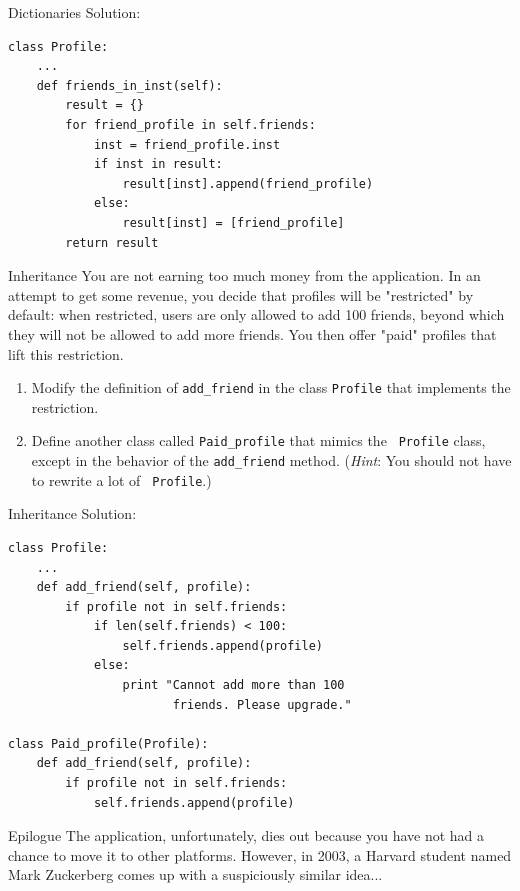 \documentclass[9pt]{beamer}
\begin{document}
\begin{frame}[fragile]{Dictionaries}
  Solution:

  \begin{lstlisting}
class Profile:
    ...
    def friends_in_inst(self):
        result = {}
        for friend_profile in self.friends:
            inst = friend_profile.inst
            if inst in result:
                result[inst].append(friend_profile)
            else:
                result[inst] = [friend_profile]
        return result
  \end{lstlisting}
\end{frame}

\begin{frame}[fragile]{Inheritance}
  You are not earning too much money from the application.  In an attempt to
  get some revenue, you decide that profiles will be "restricted" by
  default: when restricted, users are only allowed to add 100 friends,
  beyond which they will not be allowed to add more friends.  You then offer
  "paid" profiles that lift this restriction.

  \begin{enumerate}
    \item
      Modify the definition of {\tt add\_friend} in the class {\tt Profile}
      that implements the restriction.
    \item
      Define another class called {\tt Paid\_profile} that mimics the {\tt
      Profile} class, except in the behavior of the {\tt add\_friend}
      method. ({\em Hint}: You should not have to rewrite a lot of {\tt
      Profile}.)
  \end{enumerate}
\end{frame}


\begin{frame}[fragile]{Inheritance}
  Solution:
  \begin{lstlisting}
class Profile:
    ...
    def add_friend(self, profile):
        if profile not in self.friends:
            if len(self.friends) < 100:
                self.friends.append(profile)
            else:
                print "Cannot add more than 100
                       friends. Please upgrade."

class Paid_profile(Profile):
    def add_friend(self, profile):
        if profile not in self.friends:
            self.friends.append(profile)
  \end{lstlisting}
\end{frame}


\begin{frame}[fragile]{Epilogue}
  The application, unfortunately, dies out because you have not had a chance
  to move it to other platforms. However, in 2003, a Harvard student named
  Mark Zuckerberg comes up with a suspiciously similar idea...
\end{frame}
\end{document}
